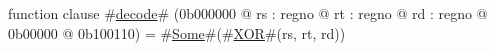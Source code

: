 function clause #\hyperref[zdecode]{decode}# (0b000000 @ rs : regno @ rt : regno @ rd : regno @ 0b00000 @ 0b100110) =
  #\hyperref[zSome]{Some}#(#\hyperref[zXOR]{XOR}#(rs, rt, rd))
